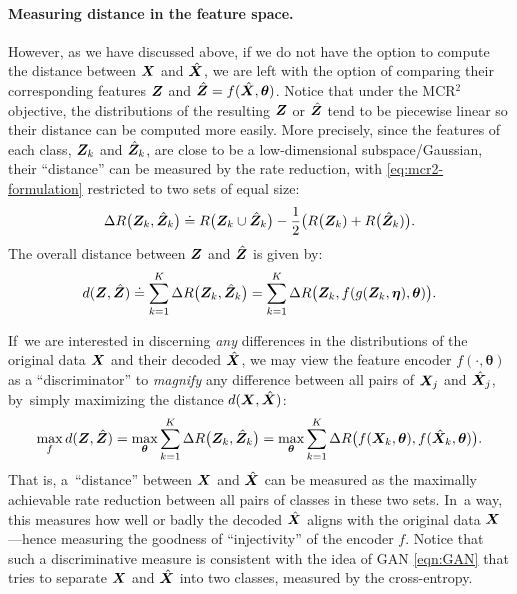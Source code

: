 \documentclass[../../book-main.tex]{subfiles}
\begin{document}
{\paragraph{Measuring distance in the feature space.}
However, as we have discussed above, if we do not have the option to compute the distance between $\bm{X}$ and $\hat {\bm{X}}$, we are left with the option of comparing their corresponding features $\bm{Z}$ and $\hat {\bm{Z}} = f(\hat {\bm{X}}, \bm \theta)$. Notice that under the MCR$^2$ objective, the distributions of the resulting $\bm{Z}$ or $\hat {\bm{Z}}$ tend to be piecewise linear so  their distance can be  computed more easily. More precisely, since the features of each class, $\bm{Z}_k$ and $\hat{\bm{Z}}_k$, are close to be a low-dimensional subspace/Gaussian, their ``distance'' can be measured by the rate reduction, {with \eqref{eq:mcr2-formulation} restricted to two sets of equal size}:
\begin{equation}
\Delta R\big(\bm{Z}_k, \hat{\bm{Z}}_k\big) \doteq R\big(\bm{Z}_k \cup \hat{\bm{Z}}_k\big) - \frac{1}{2} \big( R\big(\bm{Z}_k) + R\big(\hat {\bm{Z}}_k)\big).
\end{equation}
The overall distance between $\bm{Z}$ and $\hat {\bm{Z}}$ is given by:
\begin{equation}
d(\bm{Z}, \hat {\bm{Z}}) \doteq   \sum_{k=1}^K \Delta R\big(\bm{Z}_k, \hat{\bm{Z}}_k\big) =  \sum_{k=1}^K \Delta R\big(\bm{Z}_k, f(g(\bm{Z}_k, \bm\eta),\bm \theta)\big).
\label{eqn:Z-distance}
\end{equation}


If~we are interested in discerning {\em any} differences in the distributions of the original data $\bm{X}$ and their decoded $\hat {\bm{X}}$, we may view the feature encoder $f(\cdot, \bm \theta)$ as a ``discriminator'' to {\em magnify} any difference between all pairs of $\bm{X}_j$ and $\hat {\bm{X}}_j$, by~simply maximizing the distance $d(\bm{X}, \hat {\bm{X}})$:
\begin{equation}
\max_f d(\bm{Z}, \hat {\bm{Z}}) = \max_{\bm \theta} \sum_{k=1}^K \Delta R\big(\bm{Z}_k, \hat{\bm{Z}}_k\big) = \max_{\bm \theta} \sum_{k=1}^K \Delta R\big(f(\bm{X}_k,\bm \theta), f(\hat{\bm{X}}_k,\bm \theta)\big).
    \label{eqn:max-distance}
\end{equation}
That is, a~``distance'' between $\bm{X}$ and $\hat {\bm{X}}$ can be measured as the maximally achievable rate reduction between all pairs of classes in these two sets. In~a way, this measures how well or badly the decoded $\hat {\bm{X}}$ aligns with the original data $\bm{X}$---hence measuring the goodness of ``injectivity'' of the encoder $f$. Notice that such a discriminative measure is consistent with the idea of GAN \eqref{eqn:GAN} that tries to separate $\bm{X}$ and $\hat {\bm{X}}$ into two classes, measured by the cross-entropy. 

}
\end{document}
